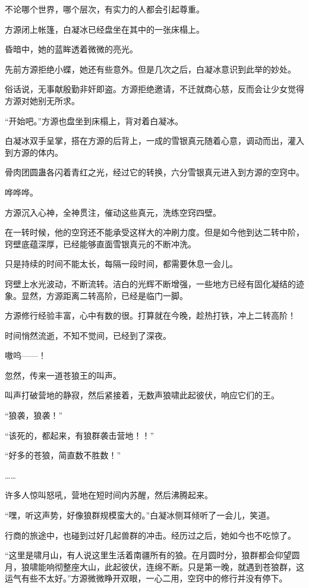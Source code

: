 \begin{this_body}
不论哪个世界，哪个层次，有实力的人都会引起尊重。

方源闭上帐篷，白凝冰已经盘坐在其中的一张床榻上。

昏暗中，她的蓝眸透着微微的亮光。

先前方源拒绝小蝶，她还有些意外。但是几次之后，白凝冰意识到此举的妙处。

俗话说，无事献殷勤非奸即盗。方源拒绝邀请，不迁就商心慈，反而会让少女觉得方源对她别无所求。

“开始吧。”方源也盘坐到床榻上，背对着白凝冰。

白凝冰双手呈掌，搭在方源的后背上，一成的雪银真元随着心意，调动而出，灌入到方源的体内。

骨肉团圆蛊各闪着青红之光，经过它的转换，六分雪银真元进入到方源的空窍中。

哗哗哗。

方源沉入心神，全神贯注，催动这些真元，洗练空窍四壁。

在一转时候，他的空窍还不能承受这样大的冲刷力度。但是如今他到达二转中阶，窍壁底蕴深厚，已经能够直面雪银真元的不断冲洗。

只是持续的时间不能太长，每隔一段时间，都需要休息一会儿。

窍壁上水光波动，不断流转。洁白的光辉不断增强，一些地方已经有固化凝结的迹象。显然，方源距离二转高阶，已经是临门一脚。

方源修行经验丰富，心中有数的很。打算就在今晚，趁热打铁，冲上二转高阶！

时间悄然流逝，不知不觉间，已经到了深夜。

嗷呜——！

忽然，传来一道苍狼王的叫声。

叫声打破营地的静寂，然后紧接着，无数声狼啸此起彼伏，响应它们的王。

“狼袭，狼袭！”

“该死的，都起来，有狼群袭击营地！！”

“好多的苍狼，简直数不胜数！”

……

许多人惊叫怒吼，营地在短时间内苏醒，然后沸腾起来。

“嘿，听这声势，好像狼群规模蛮大的。”白凝冰侧耳倾听了一会儿，笑道。

行商的旅途中，也碰到过好几起兽群的冲击。经历过之后，她如今也不吃惊了。

“这里是啸月山，有人说这里生活着南疆所有的狼。在月圆时分，狼群都会仰望圆月，狼啸能响彻整座大山，此起彼伏，连绵不断。只是第一晚，就遇到苍狼群，这运气有些不太好。”方源微微睁开双眼，一心二用，空窍中的修行并没有停下。


\end{this_body}
